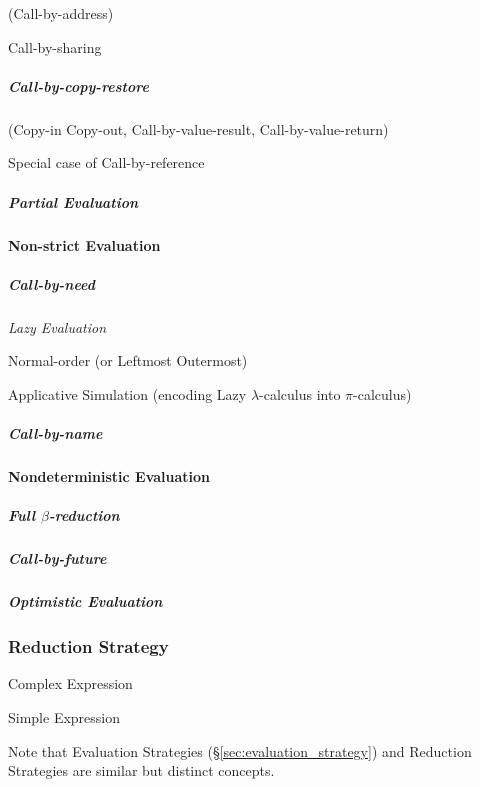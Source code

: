 (Call-by-address)

Call-by-sharing



\subparagraph{Call-by-copy-restore}\label{sec:call_by_copy_restore}\hfill

(Copy-in Copy-out, Call-by-value-result, Call-by-value-return)

Special case of Call-by-reference



\subparagraph{Partial Evaluation}\label{sec:partial_evaluation}\hfill



\paragraph{Non-strict Evaluation}\label{sec:nonstrict_evaluation}\hfill

\subparagraph{Call-by-need}\label{sec:call_by_need}\hfill

\emph{Lazy Evaluation}

Normal-order (or Leftmost Outermost)

Applicative Simulation (encoding Lazy $\lambda$-calculus into
$\pi$-calculus) \cite{milner90}



\subparagraph{Call-by-name}\label{sec:call_by_name}\hfill



\paragraph{Nondeterministic Evaluation}\hfill
\label{sec:nondeterministic_evaluation}



\subparagraph{Full $\beta$-reduction}\label{sec:full_beta_reduction}\hfill

\subparagraph{Call-by-future}\label{sec:call_by_future}\hfill

\subparagraph{Optimistic Evaluation}\label{sec:optimistic_evaluation}\hfill



\subsubsection{Reduction Strategy}\label{sec:reduction_strategy}

Complex Expression

Simple Expression

\fist Note that Evaluation Strategies
(\S\ref{sec:evaluation_strategy}) and Reduction Strategies are similar
but distinct concepts.

